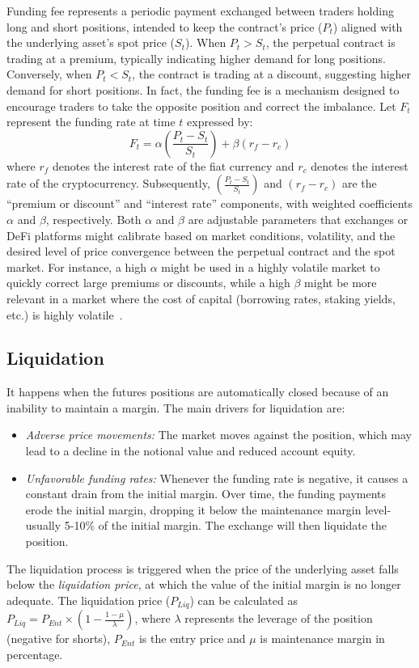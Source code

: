 Funding fee represents a periodic payment exchanged between traders holding long and short positions, intended to keep the contract's price (\(P_t\)) aligned with the underlying asset's spot price (\(S_t\)). When \(P_t > S_t\), the perpetual contract is trading at a premium, typically indicating higher demand for long positions. Conversely, when \(P_t < S_t\), the contract is trading at a discount, suggesting higher demand for short positions. In fact, the funding fee is a mechanism designed to encourage traders to take the opposite position and correct the imbalance. Let \(F_t\) represent the funding rate at time \(t\) expressed by:
\begin{equation}\label{eq:funding1}
	F_t = \alpha \left( \frac{P_t - S_t}{S_t} \right) + \beta \left( r_f - r_c \right)
\end{equation}
where \( r_f \) denotes the interest rate of the fiat currency and \( r_c \) denotes the interest rate of the cryptocurrency. Subsequently, \((\frac{P_t - S_t}{S_t})\) and \((r_f - r_c)\) are the ``premium or discount'' and ``interest rate'' components, with weighted coefficients \( \alpha \) and \( \beta \), respectively. Both \( \alpha \) and \( \beta \) are adjustable parameters that exchanges or DeFi platforms might calibrate based on market conditions, volatility, and the desired level of price convergence between the perpetual contract and the spot market. For instance, a high \( \alpha \) might be used in a highly volatile market to quickly correct large premiums or discounts, while a high \( \beta \) might be more relevant in a market where the cost of capital (borrowing rates, staking yields, etc.) is highly volatile~\cite{Binance_Funding,BitMEX_Funding}.

\subsection{Liquidation}\label{subsec:liquidation}
It happens when the futures positions are automatically closed because of an inability to maintain a margin. The main drivers for liquidation are:
\begin{itemize}
	\item \textsl{Adverse price movements:} The market moves against the position, which may lead to a decline in the notional value and reduced account equity.
	
	\item \textsl{Unfavorable funding rates:} Whenever the funding rate is negative, it causes a constant drain from the initial margin. Over time, the funding payments erode the initial margin, dropping it below the maintenance margin level-usually 5-10\% of the initial margin. The exchange will then liquidate the position.
\end{itemize}
The liquidation process is triggered when the price of the underlying asset falls below the \textit{liquidation price}, at which the value of the initial margin is no longer adequate. The liquidation price ($P_{Liq}$) can be calculated as \(P_{Liq} = P_{Ent} \times \left( 1 - \frac{1 - \mu}{\lambda} \right)\), where \(\lambda\) represents the leverage of the position (negative for shorts), \(P_{Ent}\) is the entry price and \(\mu\) is maintenance margin in percentage.

